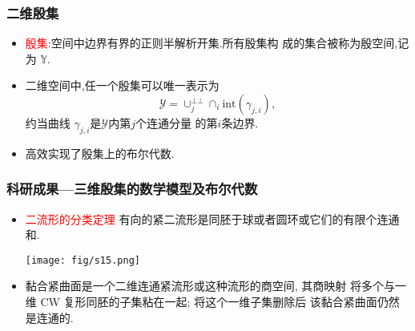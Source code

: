 \documentclass[UTF8]{ctexbeamer}	%
\theoremstyle{plain}
\theoremstyle{definition}
\theoremstyle{remark}
\numberwithin{equation}{section}
\begin{document}
\begin{frame}
    \frametitle{二维殷集}
    \begin{itemize}
        \item \textcolor{red}{殷集}:空间中边界有界的正则半解析开集.所有殷集构
              成的集合被称为殷空间,记为 $\mathbb{Y}$.
        \item 二维空间中,任一个殷集可以唯一表示为
              \[\mathcal{Y} = \cup_j^{\bot \bot}\cap_i \text{int}(\gamma_{j, i} ),\]
              约当曲线 $\gamma_{j, i}$是$\mathcal{Y}$内第$j$个连通分量
              的第$i$条边界.
        \item 高效实现了殷集上的布尔代数.
    \end{itemize}
    \begin{figure}[htb]
        \centering
    \end{figure}
\end{frame}

\begin{frame}
    \frametitle{科研成果---三维殷集的数学模型及布尔代数}
    \begin{itemize}
        \item
              \textcolor{red}{二流形的分类定理} \newline
              有向的紧二流形是同胚于球或者圆环或它们的有限个连通和.
              \begin{center}
                  \texttt{[image: fig/s15.png]}
              \end{center}


        \item 黏合紧曲面是一个二维连通紧流形或这种流形的商空间, 其商映射
              将多个与一维 CW 复形同胚的子集粘在一起; 将这个一维子集删除后
              该黏合紧曲面仍然是连通的.
    \end{itemize}
\end{frame}
\end{document}
